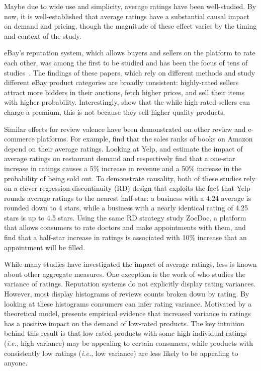 \documentclass[letter,12pt]{article}
\begin{document}
Maybe due to wide use and simplicity, average ratings have been well-studied.
By now, it is well-established that average ratings have a substantial causal
impact on demand and pricing, though the magnitude of these effect varies by
the timing and context of the study.

eBay's reputation system, which allows buyers and sellers on the platform to
rate each other, was among the first to be studied and has been the focus of
tens of studies~\citep{ba2002evidence,houser2006reputation,lucking2007pennies,eaton2002value,bajari2003winner,kalyanam2001return,mcdonald2002reputation,cabral2010dynamics,dewally2006reputation,jin2006price}. 
The findings of these papers, which rely on different methods and study
different eBay product categories are broadly consistent: highly-rated sellers
attract more bidders in their auctions, fetch higher prices, and sell their
items with higher probability. Interestingly, \citet{jin2006price} show that
the while high-rated sellers can charge a premium, this is not because they
sell higher quality products.

Similar effects for review valence have been demonstrated on other review and
e-commerce platforms. For example, \citet{chevalier2006effect} find that the
sales ranks of books on Amazon depend on their average ratings. Looking at
Yelp, \citet{luca2016reviews} and \citet{anderson2012learning} estimate the
impact of average ratings on restaurant demand and respectively find that a
one-star increase in ratings causes a 5\% increase in revenue and a 50\%
increase in the probability of being sold out. To demonstrate causality, both
of these studies rely on a clever regression discontinuity (RD) design that
exploits the fact that Yelp rounds average ratings to the nearest half-star: a
business with a 4.24 average is rounded down to 4 stars, while a business with
a nearly identical rating of 4.25 stars is up to 4.5 stars. Using the same RD
strategy \citet{luca2013digitizing} study ZocDoc, a platform that allows
consumers to rate doctors and make appointments with them, and find that a
half-star increase in ratings is associated with 10\% increase that an
appointment will be filled.

While many studies have investigated the impact of average ratings, less is
known about other aggregate measures. One exception is the work of
\citet{sun2012variance} who studies the variance of ratings. Reputation
systems do not explicitly display rating variances. However, most display
histograms of reviews counts broken down by rating. By looking at these
histograms consumers can infer rating variance. Motivated by a theoretical
model, \citet{sun2012variance} presents empirical evidence that increased
variance in ratings has a positive impact on the demand of low-rated products.
The key intuition behind this result is that low-rated products with some high
individual ratings (\emph{i.e.}, high variance) may be appealing to certain
consumers, while products with consistently low ratings (\emph{i.e.}, low
variance) are less likely to be appealing to anyone.
\end{document}
